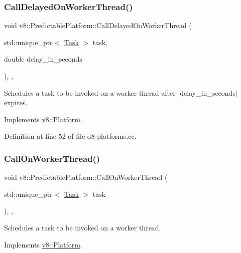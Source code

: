\subsubsection{\texorpdfstring{Call\+Delayed\+On\+Worker\+Thread()}{CallDelayedOnWorkerThread()}}
{\footnotesize\ttfamily void v8\+::\+Predictable\+Platform\+::\+Call\+Delayed\+On\+Worker\+Thread (\begin{DoxyParamCaption}\item[{std\+::unique\+\_\+ptr$<$ \mbox{\hyperlink{classv8_1_1Task}{Task}} $>$}]{task,  }\item[{double}]{delay\+\_\+in\+\_\+seconds }\end{DoxyParamCaption})\hspace{0.3cm}{\ttfamily [inline]}, {\ttfamily [override]}, {\ttfamily [virtual]}}

Schedules a task to be invoked on a worker thread after $\vert$delay\+\_\+in\+\_\+seconds$\vert$ expires. 

Implements \mbox{\hyperlink{classv8_1_1Platform_a808b0e55ed3efca10ebca031bbd6ecc6}{v8\+::\+Platform}}.



Definition at line 52 of file d8-\/platforms.\+cc.

\mbox{\label{classv8_1_1PredictablePlatform_a9b41e6b1041c62d9ff5e76a3a7a0aa69}} 
\subsubsection{\texorpdfstring{Call\+On\+Worker\+Thread()}{CallOnWorkerThread()}}
{\footnotesize\ttfamily void v8\+::\+Predictable\+Platform\+::\+Call\+On\+Worker\+Thread (\begin{DoxyParamCaption}\item[{std\+::unique\+\_\+ptr$<$ \mbox{\hyperlink{classv8_1_1Task}{Task}} $>$}]{task }\end{DoxyParamCaption})\hspace{0.3cm}{\ttfamily [inline]}, {\ttfamily [override]}, {\ttfamily [virtual]}}

Schedules a task to be invoked on a worker thread. 

Implements \mbox{\hyperlink{classv8_1_1Platform_a92dc9c2f54c9a0fea87e15df8d58d699}{v8\+::\+Platform}}.



